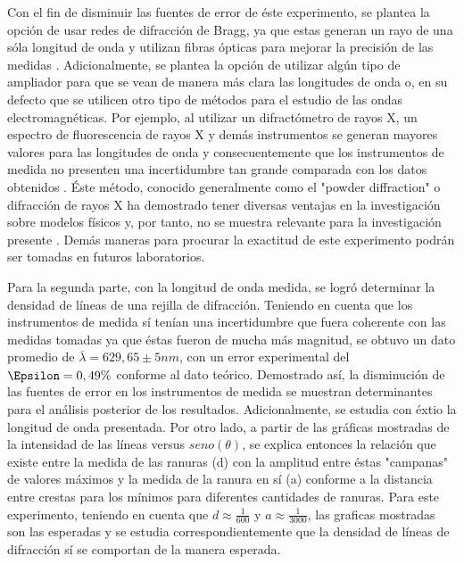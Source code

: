 \documentclass[%
 reprint,
 amsmath,amssymb,
 aps,
]{revtex4-1}
\begin{document}
Con el fin de disminuir las fuentes de error de éste experimento, se plantea la opción de usar redes de difracción de Bragg, ya que estas generan un rayo de una sóla longitud de onda y utilizan fibras ópticas para mejorar la precisión de las medidas \cite{Bragg}. Adicionalmente, se plantea la opción de utilizar algún tipo de ampliador para que se vean de manera más clara las longitudes de onda o, en su defecto que se utilicen otro tipo de métodos para el estudio de las ondas electromagnéticas. Por ejemplo, al utilizar un difractómetro de rayos X, un espectro de fluorescencia de rayos X y demás instrumentos se generan mayores valores para las longitudes de onda y consecuentemente que los instrumentos de medida no presenten una incertidumbre tan grande comparada con los datos obtenidos \cite{rayos_x}. Éste método, conocido generalmente como el "powder diffraction" o difracción de rayos X ha demostrado tener diversas ventajas en la investigación sobre modelos físicos y, por tanto, no se muestra relevante para la investigación presente \cite{powder_diffraction}. Demás maneras para procurar la exactitud de este experimento podrán ser tomadas en futuros laboratorios.

Para la segunda parte, con la longitud de onda medida, se logró determinar la densidad de líneas de una rejilla de difracción. Teniendo en cuenta que los instrumentos de medida sí tenían una incertidumbre que fuera coherente con las medidas tomadas ya que éstas fueron de mucha más magnitud, se obtuvo un dato promedio de $\overline{\lambda} = 629,65  \pm 5 nm$, con un error experimental del $\Epsilon = 0,49\%$ conforme al dato teórico. Demostrado así, la disminución de las fuentes de error en los instrumentos de medida se muestran determinantes para el análisis posterior de los resultados. Adicionalmente, se estudia con éxtio la longitud de onda presentada. Por otro lado, a partir de las gráficas mostradas de la intensidad de las líneas versus $seno(\theta)$, se explica entonces la relación que existe entre la medida de las ranuras (d) con la amplitud entre éstas "campanas" de valores máximos y la medida de la ranura en sí (a) conforme a la distancia entre crestas para los mínimos para diferentes cantidades de ranuras. Para este experimento, teniendo en cuenta que $d \approx \frac{1}{600}$ y $a \approx \frac{1}{3000}$, las graficas mostradas son las esperadas y se estudia correspondientemente que la densidad de líneas de difracción sí se comportan de la manera esperada.


\end{document}
